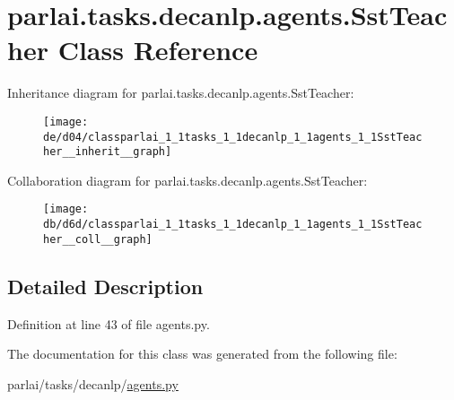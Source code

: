 \hypertarget{classparlai_1_1tasks_1_1decanlp_1_1agents_1_1SstTeacher}{}\section{parlai.\+tasks.\+decanlp.\+agents.\+Sst\+Teacher Class Reference}
\label{classparlai_1_1tasks_1_1decanlp_1_1agents_1_1SstTeacher}


Inheritance diagram for parlai.\+tasks.\+decanlp.\+agents.\+Sst\+Teacher\+:
\nopagebreak
\begin{figure}[H]
\begin{center}
\leavevmode
\texttt{[image: de/d04/classparlai\_1\_1tasks\_1\_1decanlp\_1\_1agents\_1\_1SstTeacher\_\_inherit\_\_graph]}
\end{center}
\end{figure}


Collaboration diagram for parlai.\+tasks.\+decanlp.\+agents.\+Sst\+Teacher\+:
\nopagebreak
\begin{figure}[H]
\begin{center}
\leavevmode
\texttt{[image: db/d6d/classparlai\_1\_1tasks\_1\_1decanlp\_1\_1agents\_1\_1SstTeacher\_\_coll\_\_graph]}
\end{center}
\end{figure}


\subsection{Detailed Description}


Definition at line 43 of file agents.\+py.



The documentation for this class was generated from the following file\+:\begin{DoxyCompactItemize}
\item 
parlai/tasks/decanlp/\hyperlink{parlai_2tasks_2decanlp_2agents_8py}{agents.\+py}\end{DoxyCompactItemize}
